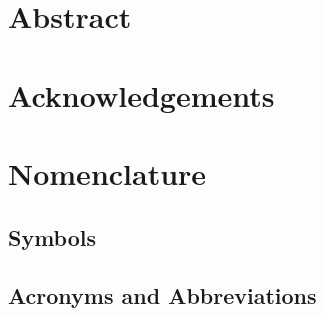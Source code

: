 
\chapter*{Abstract}

 \newpage
 
 \chapter*{Acknowledgements}
 

 \newpage


 \setcounter{tocdepth}{2}
 \tableofcontents

 \newpage


\chapter*{Nomenclature}\label{chap:symbole}

\section*{Symbols}


\section*{Acronyms and Abbreviations}


 \newpage

